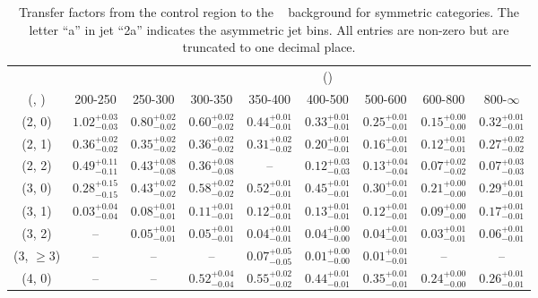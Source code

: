 \begin{table}[h!]
\tiny
\centering
\caption{Transfer factors from the \mj control region to the \zInv~ background for symmetric categories. The letter ``a'' in jet \eg ``2a''  indicates the asymmetric jet bins. All entries are non-zero but are truncated to one decimal place.\label{tab:tf_mu_zinv_sym}}
\begin{tabular}
{ccccccccc}
	\hline\hline
&	& \multicolumn{8}{c}{\scalht (\gev)} \\ 
	 (\njet,  \nb) & 200-250 & 250-300 & 300-350 & 350-400 & 400-500 & 500-600 & 600-800 & 800-$\infty$ \\ [0.8ex] 
\hline
	(2, 0) & $1.02^{+ 0.03 }_{- 0.03 }$ & $0.80^{+ 0.02 }_{- 0.02 }$ & $0.60^{+ 0.02 }_{- 0.02 }$ & $0.44^{+ 0.01 }_{- 0.01 }$ & $0.33^{+ 0.01 }_{- 0.01 }$ & $0.25^{+ 0.01 }_{- 0.01 }$ & $0.15^{+ 0.00 }_{- 0.00 }$ & $0.32^{+ 0.01 }_{- 0.01 }$ \\[0.5ex] 
	(2, 1) & $0.36^{+ 0.02 }_{- 0.02 }$ & $0.35^{+ 0.02 }_{- 0.02 }$ & $0.36^{+ 0.02 }_{- 0.02 }$ & $0.31^{+ 0.02 }_{- 0.02 }$ & $0.20^{+ 0.01 }_{- 0.01 }$ & $0.16^{+ 0.01 }_{- 0.01 }$ & $0.12^{+ 0.01 }_{- 0.01 }$ & $0.27^{+ 0.02 }_{- 0.02 }$ \\[0.5ex] 
	(2, 2) & $0.49^{+ 0.11 }_{- 0.11 }$ & $0.43^{+ 0.08 }_{- 0.08 }$ & $0.36^{+ 0.08 }_{- 0.08 }$ & -- & $0.12^{+ 0.03 }_{- 0.03 }$ & $0.13^{+ 0.04 }_{- 0.04 }$ & $0.07^{+ 0.02 }_{- 0.02 }$ & $0.07^{+ 0.03 }_{- 0.03 }$ \\[0.5ex] 
	(3, 0) & $0.28^{+ 0.15 }_{- 0.15 }$ & $0.43^{+ 0.02 }_{- 0.02 }$ & $0.58^{+ 0.02 }_{- 0.02 }$ & $0.52^{+ 0.01 }_{- 0.01 }$ & $0.45^{+ 0.01 }_{- 0.01 }$ & $0.30^{+ 0.01 }_{- 0.01 }$ & $0.21^{+ 0.00 }_{- 0.00 }$ & $0.29^{+ 0.01 }_{- 0.01 }$ \\[0.5ex] 
	(3, 1) & $0.03^{+ 0.04 }_{- 0.04 }$ & $0.08^{+ 0.01 }_{- 0.01 }$ & $0.11^{+ 0.01 }_{- 0.01 }$ & $0.12^{+ 0.01 }_{- 0.01 }$ & $0.13^{+ 0.01 }_{- 0.01 }$ & $0.12^{+ 0.01 }_{- 0.01 }$ & $0.09^{+ 0.00 }_{- 0.00 }$ & $0.17^{+ 0.01 }_{- 0.01 }$ \\[0.5ex] 
	(3, 2) & -- & $0.05^{+ 0.01 }_{- 0.01 }$ & $0.05^{+ 0.01 }_{- 0.01 }$ & $0.04^{+ 0.01 }_{- 0.01 }$ & $0.04^{+ 0.00 }_{- 0.00 }$ & $0.04^{+ 0.01 }_{- 0.01 }$ & $0.03^{+ 0.01 }_{- 0.01 }$ & $0.06^{+ 0.01 }_{- 0.01 }$ \\[0.5ex] 
	(3, $\ge3$) & -- & -- & -- & $0.07^{+ 0.05 }_{- 0.05 }$ & $0.01^{+ 0.00 }_{- 0.00 }$ & $0.01^{+ 0.01 }_{- 0.01 }$ & -- & -- \\[0.5ex] 
	(4, 0) & -- & -- & $0.52^{+ 0.04 }_{- 0.04 }$ & $0.55^{+ 0.02 }_{- 0.02 }$ & $0.44^{+ 0.01 }_{- 0.01 }$ & $0.35^{+ 0.01 }_{- 0.01 }$ & $0.24^{+ 0.00 }_{- 0.00 }$ & $0.26^{+ 0.01 }_{- 0.01 }$ \\[0.5ex] 

\end{tabular}
\end{table}
